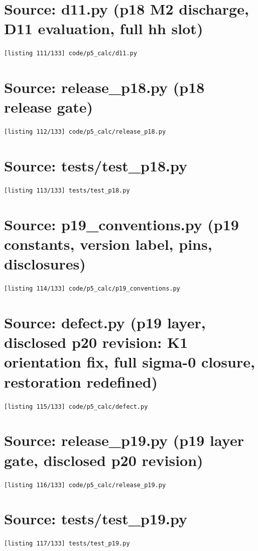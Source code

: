 \section{Source: d11.py (p18 M2 discharge, D11 evaluation, full hh slot)}
\noindent\texttt{[listing 111/133] code/p5\_calc/d11.py}
{\scriptsize}

\section{Source: release\_p18.py (p18 release gate)}
\noindent\texttt{[listing 112/133] code/p5\_calc/release\_p18.py}
{\scriptsize}

\section{Source: tests/test\_p18.py}
\noindent\texttt{[listing 113/133] tests/test\_p18.py}
{\scriptsize}

\section{Source: p19\_conventions.py (p19 constants, version label, pins, disclosures)}
\noindent\texttt{[listing 114/133] code/p5\_calc/p19\_conventions.py}
{\scriptsize}

\section{Source: defect.py (p19 layer, disclosed p20 revision: K1 orientation fix, full sigma-0 closure, restoration redefined)}
\noindent\texttt{[listing 115/133] code/p5\_calc/defect.py}
{\scriptsize}

\section{Source: release\_p19.py (p19 layer gate, disclosed p20 revision)}
\noindent\texttt{[listing 116/133] code/p5\_calc/release\_p19.py}
{\scriptsize}

\section{Source: tests/test\_p19.py}
\noindent\texttt{[listing 117/133] tests/test\_p19.py}
{\scriptsize}

